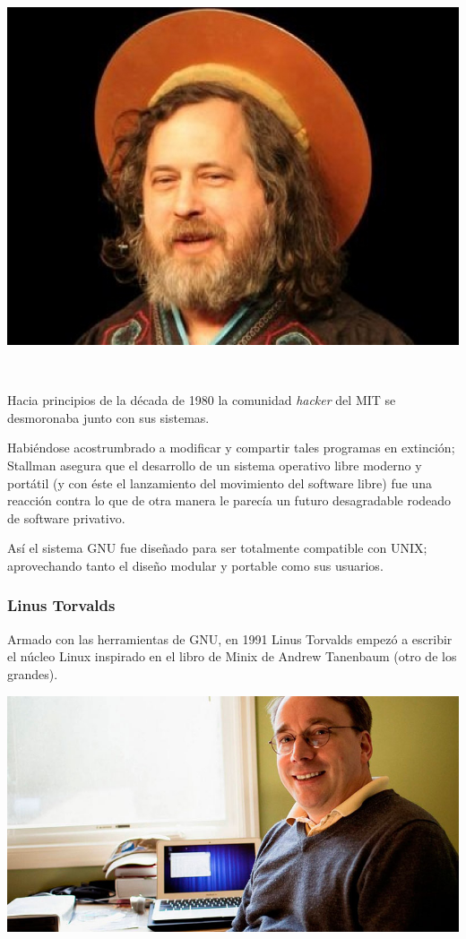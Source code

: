 \documentclass[11pt]{article}
\begin{document}
\begin{center}
\includegraphics[width=.9\linewidth]{Versiones/stallman.jpg}
\end{center}  

Hacia principios de la década de 1980 la comunidad \emph{hacker} del MIT se
desmoronaba junto con sus sistemas.

Habiéndose acostrumbrado a modificar y compartir tales programas en
extinción; Stallman asegura que el desarrollo de un sistema operativo
libre moderno y portátil (y con éste el lanzamiento del movimiento del
software libre) fue una reacción contra lo que de otra manera le parecía
un futuro desagradable rodeado de software privativo.

Así el sistema GNU fue diseñado para ser totalmente compatible con UNIX;
aprovechando tanto el diseño modular y portable como sus usuarios.

\subsubsection{Linus Torvalds}
\label{sec:org4194788}
Armado con las herramientas de GNU, en 1991 Linus Torvalds empezó a
escribir el núcleo Linux inspirado en el libro de Minix de Andrew
Tanenbaum (otro de los grandes).

\begin{center}
\includegraphics[width=.9\linewidth]{Versiones/Linus-Torvalds.jpg}
\end{center}  
\end{document}
